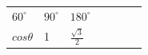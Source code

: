 {{\begin{center}
\begin{xtabular}[t]{|l|l|l|l|l|l|l|}
                \begin{math}{60}^{\circ }\end{math}
               &
    
    
        
                \begin{math}{90}^{\circ }\end{math}
               &
    
    
        
                \begin{math}{180}^{\circ }\end{math}
     \tabularnewline{}
    
    
        
                \begin{math}cos\theta \end{math}
               &
    
    
        1 &
    
    
        
                \begin{math}\frac{\sqrt{3}}{2}\end{math}
               &
    

\end{xtabular}
\end{center}}}
